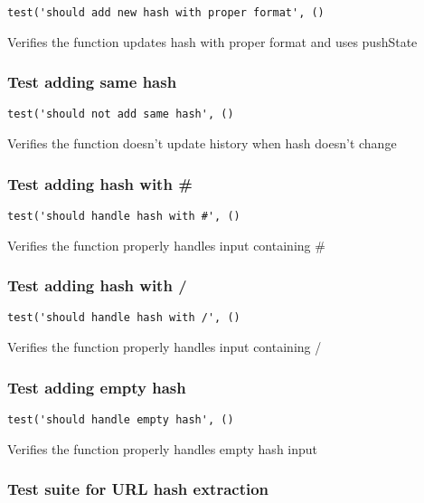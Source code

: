 \documentclass[a4paper]{article}
\begin{document}
\begin{lstlisting}
test('should add new hash with proper format', ()
\end{lstlisting}

Verifies the function updates hash with proper format
and uses pushState

\hypertarget{toc647}{}
\subsubsection{Test adding same hash}

\begin{lstlisting}
test('should not add same hash', ()
\end{lstlisting}

Verifies the function doesn't update history when hash doesn't change

\hypertarget{toc648}{}
\subsubsection{Test adding hash with \#}

\begin{lstlisting}
test('should handle hash with #', ()
\end{lstlisting}

Verifies the function properly handles input containing \#

\hypertarget{toc649}{}
\subsubsection{Test adding hash with /}

\begin{lstlisting}
test('should handle hash with /', ()
\end{lstlisting}

Verifies the function properly handles input containing /

\hypertarget{toc650}{}
\subsubsection{Test adding empty hash}

\begin{lstlisting}
test('should handle empty hash', ()
\end{lstlisting}

Verifies the function properly handles empty hash input

\hypertarget{toc651}{}
\subsubsection{Test suite for URL hash extraction}
\end{document}
